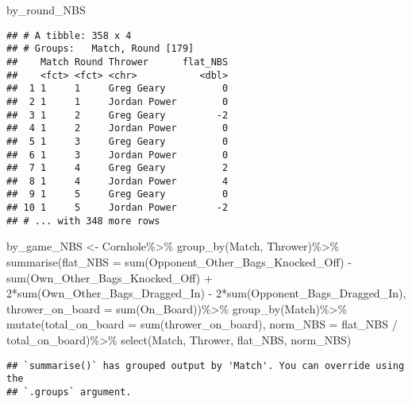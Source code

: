 \documentclass[
]{article}
\newenvironment{Shaded}{\begin{snugshade}}{\end{snugshade}}
\newcommand{\AttributeTok}[1]{\textcolor[rgb]{0.77,0.63,0.00}{#1}}
\newcommand{\DecValTok}[1]{\textcolor[rgb]{0.00,0.00,0.81}{#1}}
\newcommand{\FunctionTok}[1]{\textcolor[rgb]{0.00,0.00,0.00}{#1}}
\newcommand{\NormalTok}[1]{#1}
\newcommand{\OtherTok}[1]{\textcolor[rgb]{0.56,0.35,0.01}{#1}}
\newcommand{\SpecialCharTok}[1]{\textcolor[rgb]{0.00,0.00,0.00}{#1}}
\begin{document}
\begin{Shaded}
\begin{Highlighting}[]
\NormalTok{by\_round\_NBS}
\end{Highlighting}
\end{Shaded}

\begin{verbatim}
## # A tibble: 358 x 4
## # Groups:   Match, Round [179]
##    Match Round Thrower      flat_NBS
##    <fct> <fct> <chr>           <dbl>
##  1 1     1     Greg Geary          0
##  2 1     1     Jordan Power        0
##  3 1     2     Greg Geary         -2
##  4 1     2     Jordan Power        0
##  5 1     3     Greg Geary          0
##  6 1     3     Jordan Power        0
##  7 1     4     Greg Geary          2
##  8 1     4     Jordan Power        4
##  9 1     5     Greg Geary          0
## 10 1     5     Jordan Power       -2
## # ... with 348 more rows
\end{verbatim}

\begin{Shaded}
\begin{Highlighting}[]
\NormalTok{by\_game\_NBS }\OtherTok{\textless{}{-}}\NormalTok{ Cornhole}\SpecialCharTok{\%\textgreater{}\%}
  \FunctionTok{group\_by}\NormalTok{(Match, Thrower)}\SpecialCharTok{\%\textgreater{}\%}
  \FunctionTok{summarise}\NormalTok{(}\AttributeTok{flat\_NBS =} \FunctionTok{sum}\NormalTok{(Opponent\_Other\_Bags\_Knocked\_Off) }\SpecialCharTok{{-}} \FunctionTok{sum}\NormalTok{(Own\_Other\_Bags\_Knocked\_Off) }\SpecialCharTok{+} \DecValTok{2}\SpecialCharTok{*}\FunctionTok{sum}\NormalTok{(Own\_Other\_Bags\_Dragged\_In) }\SpecialCharTok{{-}} \DecValTok{2}\SpecialCharTok{*}\FunctionTok{sum}\NormalTok{(Opponent\_Bags\_Dragged\_In),}
            \AttributeTok{thrower\_on\_board =} \FunctionTok{sum}\NormalTok{(On\_Board))}\SpecialCharTok{\%\textgreater{}\%}
  \FunctionTok{group\_by}\NormalTok{(Match)}\SpecialCharTok{\%\textgreater{}\%}
  \FunctionTok{mutate}\NormalTok{(}\AttributeTok{total\_on\_board =} \FunctionTok{sum}\NormalTok{(thrower\_on\_board), }
         \AttributeTok{norm\_NBS =}\NormalTok{ flat\_NBS }\SpecialCharTok{/}\NormalTok{ total\_on\_board)}\SpecialCharTok{\%\textgreater{}\%}
  \FunctionTok{select}\NormalTok{(Match, Thrower, flat\_NBS, norm\_NBS)}
\end{Highlighting}
\end{Shaded}

\begin{verbatim}
## `summarise()` has grouped output by 'Match'. You can override using the
## `.groups` argument.
\end{verbatim}
\end{document}
